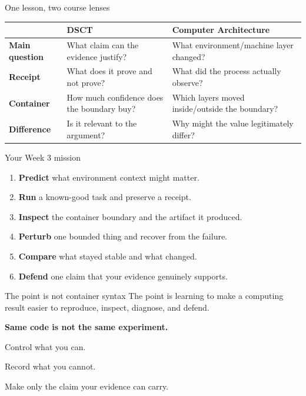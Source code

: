 \documentclass[aspectratio=169,11pt]{beamer}
\begin{document}
\begin{frame}{One lesson, two course lenses}
\begin{center}
\begin{tabular}{>{\bfseries}p{2.6cm} p{4.5cm} p{4.5cm}}
\toprule
 & DSCT & Computer Architecture \\
\midrule
Main question & What claim can the evidence justify? & What environment/machine layer changed? \\
Receipt & What does it prove and not prove? & What did the process actually observe? \\
Container & How much confidence does the boundary buy? & Which layers moved inside/outside the boundary? \\
Difference & Is it relevant to the argument? & Why might the value legitimately differ? \\
\bottomrule
\end{tabular}
\end{center}
\end{frame}

\begin{frame}{Your Week 3 mission}
\begin{enumerate}
  \item \textbf{Predict} what environment context might matter.
  \item \textbf{Run} a known-good task and preserve a receipt.
  \item \textbf{Inspect} the container boundary and the artifact it produced.
  \item \textbf{Perturb} one bounded thing and recover from the failure.
  \item \textbf{Compare} what stayed stable and what changed.
  \item \textbf{Defend} one claim that your evidence genuinely supports.
\end{enumerate}

\begin{exampleblock}{The point is not container syntax}
The point is learning to make a computing result easier to reproduce, inspect, diagnose, and defend.
\end{exampleblock}
\end{frame}

{
\begin{frame}[plain]
\vfill
\begin{center}
{\Huge\bfseries\color{white}Same code is not the same experiment.\par}
\vspace{0.55cm}
{\Large\color{WarmGold}Control what you can.\par}
\vspace{0.22cm}
{\Large\color{SoftBlue}Record what you cannot.\par}
\vspace{0.22cm}
{\Large\color{white}Make only the claim your evidence can carry.\par}
\end{center}
\vfill
\end{frame}}
\end{document}
